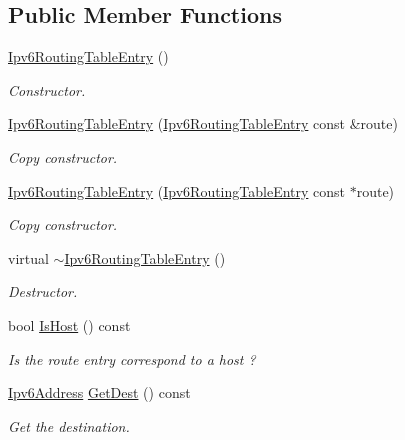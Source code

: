\subsection*{Public Member Functions}
\begin{DoxyCompactItemize}
\item 
\hyperlink{classns3_1_1Ipv6RoutingTableEntry_a1f92292be7156a9777858b60243f592c}{Ipv6\+Routing\+Table\+Entry} ()
\begin{DoxyCompactList}\small\item\em Constructor. \end{DoxyCompactList}\item 
\hyperlink{classns3_1_1Ipv6RoutingTableEntry_a5fcd91d38ee3c6c0b0178fade4f49e1b}{Ipv6\+Routing\+Table\+Entry} (\hyperlink{classns3_1_1Ipv6RoutingTableEntry}{Ipv6\+Routing\+Table\+Entry} const \&route)
\begin{DoxyCompactList}\small\item\em Copy constructor. \end{DoxyCompactList}\item 
\hyperlink{classns3_1_1Ipv6RoutingTableEntry_a301a57f465ba59d99044982b4d72f081}{Ipv6\+Routing\+Table\+Entry} (\hyperlink{classns3_1_1Ipv6RoutingTableEntry}{Ipv6\+Routing\+Table\+Entry} const $\ast$route)
\begin{DoxyCompactList}\small\item\em Copy constructor. \end{DoxyCompactList}\item 
virtual \hyperlink{classns3_1_1Ipv6RoutingTableEntry_ab5156fe805b79e029961cacf5aa4d541}{$\sim$\+Ipv6\+Routing\+Table\+Entry} ()
\begin{DoxyCompactList}\small\item\em Destructor. \end{DoxyCompactList}\item 
bool \hyperlink{classns3_1_1Ipv6RoutingTableEntry_ae97551798a8f4e58b7afe06121765666}{Is\+Host} () const 
\begin{DoxyCompactList}\small\item\em Is the route entry correspond to a host ? \end{DoxyCompactList}\item 
\hyperlink{classns3_1_1Ipv6Address}{Ipv6\+Address} \hyperlink{classns3_1_1Ipv6RoutingTableEntry_a524d3fd03456bd33802a1053c0cc92c0}{Get\+Dest} () const 
\begin{DoxyCompactList}\small\item\em Get the destination. \end{DoxyCompactList}\item 

\end{DoxyCompactItemize}
